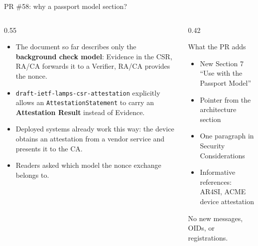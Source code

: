 \documentclass[aspectratio=169,10pt]{beamer}
\begin{document}
\begin{frame}{PR \#58: why a passport model section?}
  \begin{columns}[T,onlytextwidth]
    \begin{column}{0.55\textwidth}
      \begin{itemize}
        \item The document so far describes only the
              \textbf{background check model}: Evidence in the CSR, RA/CA
              forwards it to a Verifier, RA/CA provides the nonce.
        \item \texttt{draft-ietf-lamps-csr-attestation} explicitly allows an
              \texttt{AttestationStatement} to carry an
              \textbf{Attestation Result} instead of Evidence.
        \item Deployed systems already work this way: the device obtains an
              attestation from a vendor service and presents it to the CA.
        \item Readers asked which model the nonce exchange belongs to.
      \end{itemize}
    \end{column}
    \begin{column}{0.42\textwidth}
      \begin{block}{What the PR adds}
        \begin{itemize}
          \item New Section 7 ``Use with the Passport Model''
          \item Pointer from the architecture section
          \item One paragraph in Security Considerations
          \item Informative references: AR4SI, ACME device attestation
        \end{itemize}
      \end{block}
      \vspace{0.15cm}
      \small No new messages, OIDs, or registrations.
    \end{column}
  \end{columns}
\end{frame}
\end{document}
